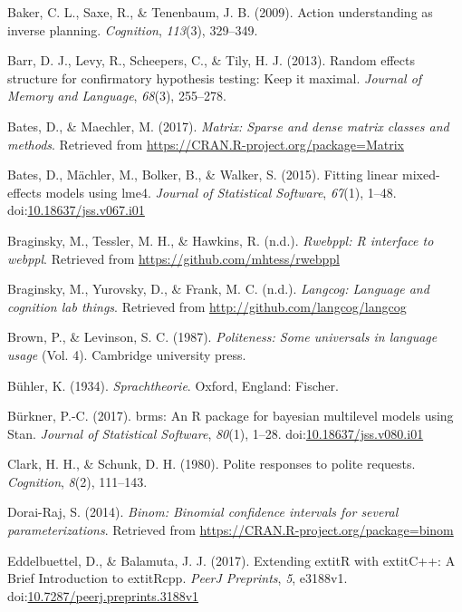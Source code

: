 \documentclass[floatsintext,man]{apa6}
\theoremstyle{definition}
\theoremstyle{definition}
\theoremstyle{definition}
\theoremstyle{remark}
\begin{document}
\hypertarget{ref-baker2009action}{}
Baker, C. L., Saxe, R., \& Tenenbaum, J. B. (2009). Action understanding
as inverse planning. \emph{Cognition}, \emph{113}(3), 329--349.

\hypertarget{ref-barr2013random}{}
Barr, D. J., Levy, R., Scheepers, C., \& Tily, H. J. (2013). Random
effects structure for confirmatory hypothesis testing: Keep it maximal.
\emph{Journal of Memory and Language}, \emph{68}(3), 255--278.

\hypertarget{ref-R-Matrix}{}
Bates, D., \& Maechler, M. (2017). \emph{Matrix: Sparse and dense matrix
classes and methods}. Retrieved from
\url{https://CRAN.R-project.org/package=Matrix}

\hypertarget{ref-R-lme4}{}
Bates, D., Mächler, M., Bolker, B., \& Walker, S. (2015). Fitting linear
mixed-effects models using lme4. \emph{Journal of Statistical Software},
\emph{67}(1), 1--48.
doi:\href{https://doi.org/10.18637/jss.v067.i01}{10.18637/jss.v067.i01}

\hypertarget{ref-R-rwebppl}{}
Braginsky, M., Tessler, M. H., \& Hawkins, R. (n.d.). \emph{Rwebppl: R
interface to webppl}. Retrieved from
\url{https://github.com/mhtess/rwebppl}

\hypertarget{ref-R-langcog}{}
Braginsky, M., Yurovsky, D., \& Frank, M. C. (n.d.). \emph{Langcog:
Language and cognition lab things}. Retrieved from
\url{http://github.com/langcog/langcog}

\hypertarget{ref-brown1987}{}
Brown, P., \& Levinson, S. C. (1987). \emph{Politeness: Some universals
in language usage} (Vol. 4). Cambridge university press.

\hypertarget{ref-buhler1934}{}
Bühler, K. (1934). \emph{Sprachtheorie}. Oxford, England: Fischer.

\hypertarget{ref-R-brms}{}
Bürkner, P.-C. (2017). brms: An R package for bayesian multilevel models
using Stan. \emph{Journal of Statistical Software}, \emph{80}(1), 1--28.
doi:\href{https://doi.org/10.18637/jss.v080.i01}{10.18637/jss.v080.i01}

\hypertarget{ref-clark1980}{}
Clark, H. H., \& Schunk, D. H. (1980). Polite responses to polite
requests. \emph{Cognition}, \emph{8}(2), 111--143.

\hypertarget{ref-R-binom}{}
Dorai-Raj, S. (2014). \emph{Binom: Binomial confidence intervals for
several parameterizations}. Retrieved from
\url{https://CRAN.R-project.org/package=binom}

\hypertarget{ref-R-Rcpp_b}{}
Eddelbuettel, D., \& Balamuta, J. J. (2017). Extending extitR with
extitC++: A Brief Introduction to extitRcpp. \emph{PeerJ Preprints},
\emph{5}, e3188v1.
doi:\href{https://doi.org/10.7287/peerj.preprints.3188v1}{10.7287/peerj.preprints.3188v1}
\end{document}

